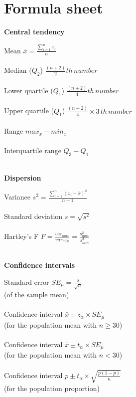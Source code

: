 

\section{Formula sheet}
\label{formulasheet}

\begin{minipage}[t]{.45\textwidth}
\begin{center}
    \textbf{Central tendency}
\end{center}
\hline
\answerskip
Mean \hfill $\bar{x} = \frac{\sum^n_{i = 1} x_i}{n}$ \\
\\
Median ($Q_2$) \hfill $\frac{(n + 2)}{2}th \, number$ \\
\\
Lower quartile ($Q_1$) \hfill $\frac{(n + 2)}{4}th \, number$ \\
\\
Upper quartile ($Q_1$) \hfill $\frac{(n + 2)}{4} \times 3\, th \, number$ \\
\\
Range \hfill $max_x - min_x$ \\
\\
Interquartile range \hfill $Q_3 - Q_1$ \\
\\
\begin{center}
    \textbf{Dispersion}
\end{center}
\hline
\answerskip
Variance \hfill $s^2 = \frac{\sum^n_{i = 1} (x_i - \bar{x})^2}{n - 1}$ \\
\\
Standard deviation \hfill $s = \sqrt{s^2}$ \\
\\
Hartley's F \hfill $F = \frac{var_{max}}{var_{min}} = \frac{s^2_{max}}{s^2_{min}}$\\
\\
\begin{center}
    \textbf{Confidence intervals}
\end{center}
\hline
\answerskip
Standard error \hfill $SE_\mu = \frac{s}{\sqrt{n}}$ \\
{\scriptsize (of the sample mean)}\\
\\
Confidence interval \hfill $\bar{x} \pm z_\alpha \times SE_\mu$ \\
{\scriptsize (for the population mean with $n \geq 30$)}\\
\\
Confidence interval \hfill $\bar{x} \pm t_\alpha \times SE_\mu$ \\
{\scriptsize (for the population mean with $n < 30$)}\\
\\
Confidence interval \hfill $p \pm t_\alpha \times \sqrt{\frac{p(1 - p)}{n}}$ \\
{\scriptsize (for the population proportion)}\\
\end{minipage}

